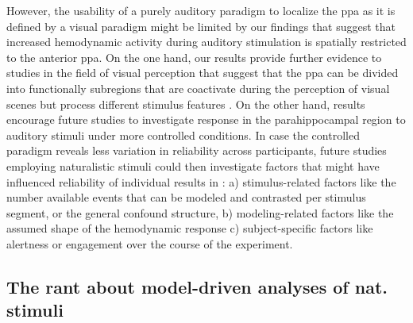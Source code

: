 %
However, the usability of a purely auditory paradigm to localize the \ac{ppa} as
it is defined by a visual paradigm might be limited by our findings that suggest
that increased hemodynamic activity during auditory stimulation is spatially
restricted to the anterior \ac{ppa}.
%
On the one hand, our results provide further evidence to studies in the field of
visual perception that suggest that the \ac{ppa} can be divided into
functionally subregions that are coactivate during the perception of visual
scenes but process different stimulus features
\citep{aminoff2007parahippocampal, baldassano2013differential}.
%
On the other hand, results encourage future studies to investigate response in
the parahippocampal region to auditory stimuli under more controlled conditions.
%
In case the controlled paradigm reveals less variation in reliability across
participants, future studies employing naturalistic stimuli could then
investigate factors that might have influenced reliability of individual results
in \citet{haeusler2022processing}:
%
a) stimulus-related factors like the number available events that can be modeled
and contrasted per stimulus segment, or the general confound structure,
%
b) modeling-related factors like the assumed shape of the hemodynamic response
%
c) subject-specific factors like alertness or engagement over the course of the
experiment.


\subsection{The rant about model-driven analyses of nat. stimuli}





